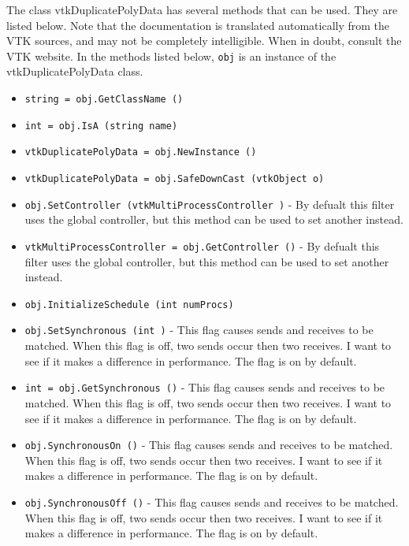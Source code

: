 The class vtkDuplicatePolyData has several methods that can be used.
  They are listed below.
Note that the documentation is translated automatically from the VTK sources,
and may not be completely intelligible.  When in doubt, consult the VTK website.
In the methods listed below, \verb|obj| is an instance of the vtkDuplicatePolyData class.
\begin{itemize}
\item  \verb|string = obj.GetClassName ()|

\item  \verb|int = obj.IsA (string name)|

\item  \verb|vtkDuplicatePolyData = obj.NewInstance ()|

\item  \verb|vtkDuplicatePolyData = obj.SafeDownCast (vtkObject o)|

\item  \verb|obj.SetController (vtkMultiProcessController )| -  By defualt this filter uses the global controller,
 but this method can be used to set another instead.

\item  \verb|vtkMultiProcessController = obj.GetController ()| -  By defualt this filter uses the global controller,
 but this method can be used to set another instead.

\item  \verb|obj.InitializeSchedule (int numProcs)|

\item  \verb|obj.SetSynchronous (int )| -  This flag causes sends and receives to be matched.
 When this flag is off, two sends occur then two receives.
 I want to see if it makes a difference in performance.
 The flag is on by default.

\item  \verb|int = obj.GetSynchronous ()| -  This flag causes sends and receives to be matched.
 When this flag is off, two sends occur then two receives.
 I want to see if it makes a difference in performance.
 The flag is on by default.

\item  \verb|obj.SynchronousOn ()| -  This flag causes sends and receives to be matched.
 When this flag is off, two sends occur then two receives.
 I want to see if it makes a difference in performance.
 The flag is on by default.

\item  \verb|obj.SynchronousOff ()| -  This flag causes sends and receives to be matched.
 When this flag is off, two sends occur then two receives.
 I want to see if it makes a difference in performance.
 The flag is on by default.


\end{itemize}
